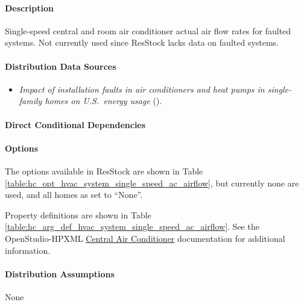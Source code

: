 \paragraph{Description}
% 
Single-speed central and room air conditioner actual air flow rates for faulted systems. Not currently used since ResStock lacks data on faulted systems. 

\paragraph{Distribution Data Sources}
% 
\begin{itemize}
\item 

\textit{Impact of installation faults in air conditioners and heat pumps in single-family homes on U.S.~energy usage} (\cite{Winkler2020}). 
\end{itemize}

\paragraph{Direct Conditional Dependencies}


\paragraph{Options}
The options available in ResStock are shown in Table \ref{table:hc_opt_hvac_system_single_speed_ac_airflow}, but currently none are used, and all homes as set to ``None''.



Property definitions are shown in Table \ref{table:hc_arg_def_hvac_system_single_speed_ac_airflow}. See the OpenStudio-HPXML \href{-https://openstudio-hpxml.readthedocs.io/en/v1.10.0/workflow_inputs.html#central-air-conditioner}{Central Air Conditioner} documentation for additional information.



\paragraph{Distribution Assumptions}
% 
None
